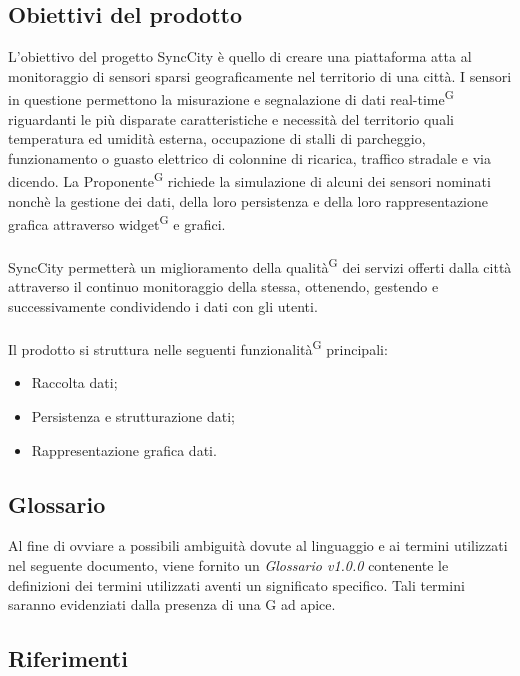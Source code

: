 \documentclass[8pt]{article}
\newcommand{\glossterm}[1]{#1\textsuperscript{G}} %
\begin{document}
\subsection{Obiettivi del prodotto}
L'obiettivo del progetto SyncCity è quello di creare una piattaforma atta al monitoraggio
di sensori sparsi geograficamente nel territorio di una città. I sensori in questione
permettono la misurazione e segnalazione di dati \glossterm{real-time} riguardanti le più disparate
caratteristiche e necessità del territorio quali temperatura ed umidità esterna, occupazione di
stalli di parcheggio, funzionamento o guasto elettrico di colonnine di ricarica, traffico stradale e via
dicendo. La \glossterm{Proponente} richiede la simulazione di alcuni dei sensori nominati nonchè la
gestione dei dati, della loro persistenza e della loro rappresentazione grafica attraverso
\glossterm{widget} e
grafici. \\\\SyncCity permetterà un miglioramento della \glossterm{qualità} dei servizi offerti dalla città attraverso il continuo monitoraggio della stessa, ottenendo, gestendo e successivamente condividendo i dati con gli utenti. 
\\\\
Il prodotto si struttura nelle seguenti \glossterm{funzionalità} principali:
\begin{itemize}
	\setlength\itemsep{0em}
	\item Raccolta dati;
	\item Persistenza e strutturazione dati;
	\item Rappresentazione grafica dati.
\end{itemize}
\subsection{Glossario} 
Al fine di ovviare a possibili ambiguità dovute al linguaggio e ai termini utilizzati nel seguente
documento, viene fornito un \textit{Glossario v1.0.0} contenente le definizioni dei termini utilizzati aventi un significato specifico. Tali termini saranno evidenziati dalla presenza di una G ad apice.
\subsection{Riferimenti}
\end{document}
